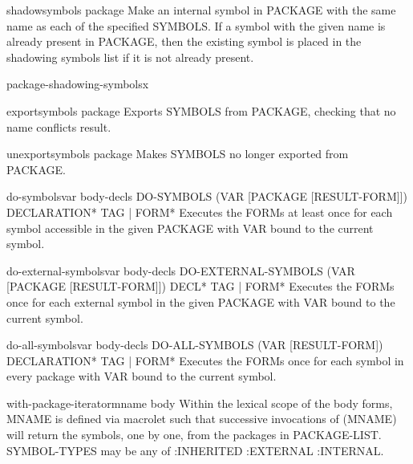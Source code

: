 \documentclass[10pt,english]{book}
\begin{document}
\begin{function}{shadow}{symbols \op package}
  Make an internal symbol in PACKAGE with the same name as each of the
specified SYMBOLS. If a symbol with the given name is already present in
PACKAGE, then the existing symbol is placed in the shadowing symbols list if
it is not already present.
\end{function}

\begin{function}{package-shadowing-symbols}{x}
  
\end{function}

\begin{function}{export}{symbols \op package}
  Exports SYMBOLS from PACKAGE, checking that no name conflicts result.
\end{function}

\begin{function}{unexport}{symbols \op package}
  Makes SYMBOLS no longer exported from PACKAGE.
\end{function}

\begin{macro}{do-symbols}{var \body body-decls}
  DO-SYMBOLS (VAR [PACKAGE [RESULT-FORM]]) {DECLARATION}* {TAG | FORM}*
   Executes the FORMs at least once for each symbol accessible in the given
   PACKAGE with VAR bound to the current symbol.
\end{macro}

\begin{macro}{do-external-symbols}{var \body body-decls}
  DO-EXTERNAL-SYMBOLS (VAR [PACKAGE [RESULT-FORM]]) {DECL}* {TAG | FORM}*
   Executes the FORMs once for each external symbol in the given PACKAGE with
   VAR bound to the current symbol.
\end{macro}

\begin{macro}{do-all-symbols}{var \body body-decls}
  DO-ALL-SYMBOLS (VAR [RESULT-FORM]) {DECLARATION}* {TAG | FORM}*
   Executes the FORMs once for each symbol in every package with VAR bound
   to the current symbol.
\end{macro}

\begin{macro}{with-package-iterator}{mname \body body}
  Within the lexical scope of the body forms, MNAME is defined via macrolet
such that successive invocations of (MNAME) will return the symbols, one by
one, from the packages in PACKAGE-LIST. SYMBOL-TYPES may be any
of :INHERITED :EXTERNAL :INTERNAL.
\end{macro}
\end{document}
